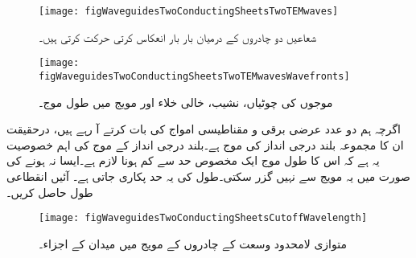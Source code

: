 \begin{figure}
\centering
\texttt{[image: figWaveguidesTwoConductingSheetsTwoTEMwaves]}
\caption{شعاعیں دو چادروں کے درمیان بار بار انعکاس کرتی حرکت کرتی ہیں۔}
\label{شکل_مویج_شعاع_انعکاس_کرتی_حرکت_کرتی_ہے}
\end{figure}
%
\begin{figure}
\centering
\texttt{[image: figWaveguidesTwoConductingSheetsTwoTEMwavesWavefronts]}
\caption{موجوں کی چوٹیاں، نشیب، خالی خلاء اور مویج میں طول موج۔}
\label{شکل_مویج_خالی_خلاء_اور_میوج_طول-موج}
\end{figure}

اگرچہ ہم دو عدد عرضی برقی و مقناطیسی  امواج کی بات کرتے آ رہے ہیں، درحقیقت ان کا مجموعہ بلند درجی  انداز کی موج ہے۔بلند درجی انداز کے موج کی اہم خصوصیت  یہ ہے کہ اس کا طول موج ایک مخصوص حد سے کم ہونا لازم ہے۔ایسا نہ ہونے کی صورت میں یہ مویج سے نہیں گزر سکتی۔طول کی یہ حد  پکاری جاتی ہے۔ آئیں انقطاعی طول حاصل کریں۔

 \begin{figure}
\centering
\texttt{[image: figWaveguidesTwoConductingSheetsCutoffWavelength]}
\caption{متوازی لامحدود وسعت کے چادروں کے مویج میں میدان کے اجزاء۔}
\label{شکل_مویج_متوازی_چادر_مویج_اجزاء_میدان}
\end{figure}

